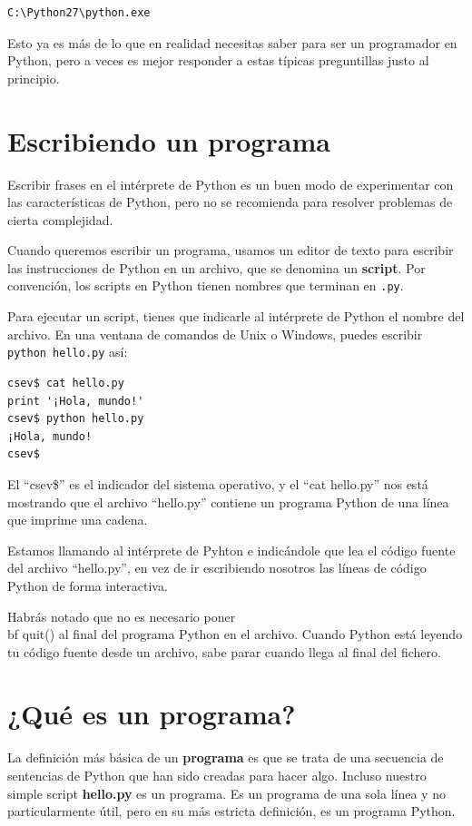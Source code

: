 \beforeverb
\begin{verbatim}
C:\Python27\python.exe
\end{verbatim}
\afterverb
%
Esto ya es más de lo que en realidad necesitas saber para ser un programador en Python,
pero a veces es mejor responder a estas típicas preguntillas justo
al principio.

\section{Escribiendo un programa}

Escribir frases en el intérprete de Python es un buen modo de experimentar
con las características de Python, pero no se recomienda para resolver problemas
de cierta complejidad.

Cuando queremos escribir un programa,
usamos un editor de texto para escribir las instrucciones de Python en un archivo,
que se denomina un {\bf script}. Por
convención, los scripts en Python tienen nombres que terminan en {\tt .py}.


Para ejecutar un script, tienes que indicarle al intérprete de Python
el nombre del archivo. En una ventana de comandos de Unix o Windows,
puedes escribir {\tt python hello.py} así:

\beforeverb
\begin{verbatim}
csev$ cat hello.py
print '¡Hola, mundo!'
csev$ python hello.py
¡Hola, mundo!
csev$
\end{verbatim}
\afterverb
%
El ``csev\$'' es el indicador del sistema operativo, y el ``cat hello.py'' nos
está mostrando que el archivo ``hello.py'' contiene un programa Python de una línea
que imprime una cadena.

Estamos llamando al intérprete de Pyhton e indicándole que lea el código fuente del
archivo ``hello.py'', en vez de ir escribiendo nosotros las líneas de código Python
de forma interactiva.

Habrás notado que no es necesario poner {\\bf quit()} al final del programa
Python en el archivo. Cuando Python está leyendo tu código fuente
desde un archivo, sabe parar cuando llega al final del fichero.

\section{¿Qué es un programa?}

La definición más básica de un {\bf programa} es que se trata de una
secuencia de sentencias de Python que han sido creadas para hacer algo.
Incluso nuestro simple script {\bf hello.py} es un programa. Es un programa
de una sola línea y no particularmente útil, pero en su más estricta definición,
es un programa Python. 

